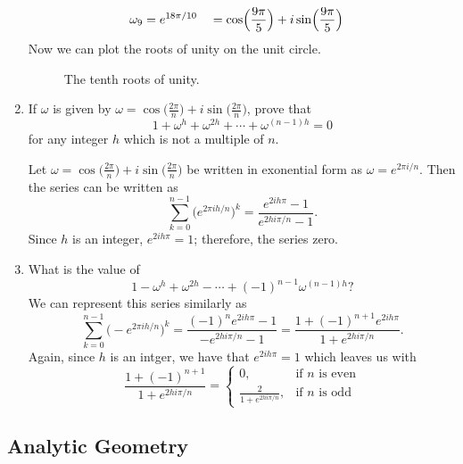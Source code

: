 \begin{enumerate}
\begin{alignat*}{2}
    \omega_9 & = e^{18\pi/10} &&{}=
    \cos\Bigl(\frac{9\pi}{5}\Bigr) + i\sin\Bigl(\frac{9\pi}{5}\Bigr)
  \end{alignat*}
  Now we can plot the roots of unity on the unit circle.
  \begin{figure}[H]
    \centering
    
    \caption{The tenth roots of unity.}
  \end{figure}
\item
  If \(\omega\) is given by \(\omega = \cos\bigl(\frac{2\pi}{n}\bigr) +
  i\sin\bigl(\frac{2\pi}{n}\bigr)\), prove that
  \[
  1 + \omega^h + \omega^{2h} + \cdots + \omega^{(n - 1)h} = 0
  \]
  for any integer \(h\) which is not a multiple of \(n\).
  \par\smallskip
  Let \(\omega = \cos\bigl(\frac{2\pi}{n}\bigr) +
  i\sin\bigl(\frac{2\pi}{n}\bigr)\) be written in exonential form as
  \(\omega = e^{2\pi i/n}\).
  Then the series can be written as
  \[
  \sum_{k = 0}^{n - 1}\bigl(e^{2\pi ih/n}\bigr)^k =
  \frac{e^{2ih\pi} - 1}{e^{2hi\pi/n} - 1}.
  \]
  Since \(h\) is an integer, \(e^{2ih\pi} = 1\); therefore, the series zero.
\item
  What is the value of
  \[
  1 - \omega^h + \omega^{2h} - \cdots + (-1)^{n - 1}\omega^{(n - 1)h}\mbox{?}
  \]
  We can represent this series similarly as
  \[
  \sum_{k = 0}^{n - 1}\bigl(-e^{2\pi ih/n}\bigr)^k =
  \frac{(-1)^ne^{2ih\pi} - 1}{-e^{2hi\pi/n} - 1} =
  \frac{1 + (-1)^{n + 1}e^{2ih\pi}}{1 + e^{2hi\pi/n}}.
  \]
  Again, since \(h\) is an intger, we have that \(e^{2ih\pi} = 1\) which leaves
  us with
  \[
  \frac{1 + (-1)^{n + 1}}{1 + e^{2hi\pi/n}} =
  \begin{cases}
    0, & \text{if \(n\) is even}\\
    \frac{2}{1 + e^{2hi\pi/n}}, & \text{if \(n\) is odd}
  \end{cases}
  \]
\end{enumerate}

\subsection{Analytic Geometry}

